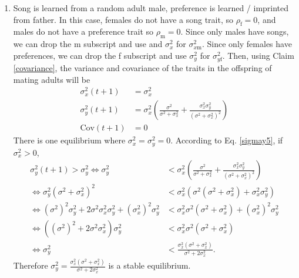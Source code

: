 \documentclass{article}
\newcommand{\x}[1]{\text{#1}}
\newcommand{\Cov}{\text{Cov}}
\begin{document}
\begin{enumerate}
\item Song is learned from a random adult male, preference is learned / imprinted from father. 
In this case, females do not have a song trait, so $\rho_\x{f}=0$, and males do not have a preference trait so $\rho_\x{m}=0$. Since only males have songs, we can drop the m subscript and use and $\sigma_x^2$ for $\sigma_{x\x{m}}^2$. Since only females have preferences, we can drop the f subscript and use $\sigma_y^2$ for $\sigma_{y\x{f}}^2$. Then, using Claim \ref{covariance}, the variance and covariance of the traits in the offspring of mating adults will be 
\begin{align}
\sigma_x^2(t+1)&=\sigma_x^2 \label{sigmax5}
\\ \sigma_y^2(t+1)&=\sigma_x^2\left(\frac{\sigma^2}{\sigma^2+\sigma_x^2}+\frac{\sigma_x^2\sigma_y^2}{(\sigma^2+\sigma_x^2)^2}\right) \label{sigmay5}
\\ \Cov(t+1)&=0
\end{align}
There is one equilibrium where $\sigma_x^2=\sigma_y^2=0$. According to Eq. \ref{sigmay5}, if $\sigma_x^2>0$,
\begin{align*}
\sigma_y^2(t+1)>\sigma_y^2 \Leftrightarrow \sigma_y^2&<\sigma_x^2\left(\frac{\sigma^2}{\sigma^2+\sigma_x^2}+\frac{\sigma_x^2\sigma_y^2}{(\sigma^2+\sigma_x^2)^2}\right)
\\ \Leftrightarrow \sigma_y^2(\sigma^2+\sigma_x^2)^2&<\sigma_x^2(\sigma^2(\sigma^2+\sigma_x^2)+\sigma_x^2\sigma_y^2)
\\\Leftrightarrow (\sigma^2)^2\sigma_y^2+2\sigma^2\sigma_x^2\sigma_y^2+(\sigma_x^2)^2\sigma_y^2&<\sigma_x^2\sigma^2(\sigma^2+\sigma_x^2)+(\sigma_x^2)^2\sigma_y^2
\\ \Leftrightarrow ((\sigma^2)^2+2\sigma^2\sigma_x^2)\sigma_y^2&<\sigma_x^2\sigma^2(\sigma^2+\sigma_x^2)
\\ \Leftrightarrow \sigma_y^2&<\frac{\sigma_x^2(\sigma^2+\sigma_x^2)}{\sigma^2+2\sigma_x^2}.
\end{align*}
Therefore $\sigma_y^2=\frac{\sigma_x^2(\sigma^2+\sigma_x^2)}{\sigma^2+2\sigma_x^2}$ is a stable equilibrium.




\end{enumerate}
\end{document}
